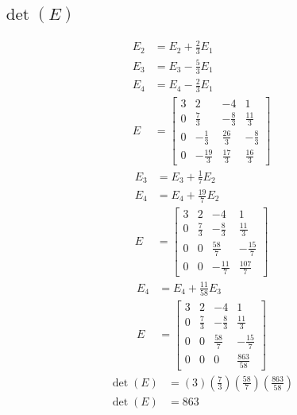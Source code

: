 \documentclass{article}
\begin{document}
\subsection{$ \det(E) $}
\begin{align*}
	E_2 & = E_2 + \frac{2}{3}E_1 \\
	E_3 & = E_3 - \frac{5}{3}E_1 \\
	E_4 & = E_4 - \frac{2}{3}E_1 \\
	E & = \begin{bmatrix}
		3 & 2 & -4 & 1 \\
		0 & \frac{7}{3} & -\frac{8}{3} & \frac{11}{3} \\
		0 & -\frac{1}{3} & \frac{26}{3} & -\frac{8}{3} \\
		0 & -\frac{19}{3} & \frac{17}{3} & \frac{16}{3}
	\end{bmatrix}
\end{align*}
\begin{align*}
	E_3 & = E_3 + \frac{1}{7}E_2 \\
	E_4 & = E_4 + \frac{19}{7}E_2 \\
	E & = \begin{bmatrix}
		3 & 2 & -4 & 1 \\
		0 & \frac{7}{3} & -\frac{8}{3} & \frac{11}{3} \\
		0 & 0 & \frac{58}{7} & -\frac{15}{7} \\
		0 & 0 & -\frac{11}{7} & \frac{107}{7}
	\end{bmatrix}
\end{align*}
\begin{align*}
	E_4 & = E_4 + \frac{11}{58}E_3 \\
	E & = \begin{bmatrix}
		3 & 2 & -4 & 1 \\
		0 & \frac{7}{3} & -\frac{8}{3} & \frac{11}{3} \\
		0 & 0 & \frac{58}{7} & -\frac{15}{7} \\
		0 & 0 & 0 & \frac{863}{58}
	\end{bmatrix}
\end{align*}
\begin{align*}
	\det(E) & = (3) \left( \frac{7}{3} \right) \left( \frac{58}{7} \right) \left( \frac{863}{58} \right) \\
	\det(E) & = 863
\end{align*}
\end{document}
